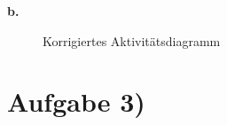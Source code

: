 \documentclass{swp1}
\begin{document}
\textbf{b.}\newline
\newline
\begin{figure}[h]
\caption{Korrigiertes Aktivitätsdiagramm}
\label{ab2}
\end{figure}
\newline
\clearpage

\section*{Aufgabe 3)}
\end{document}
